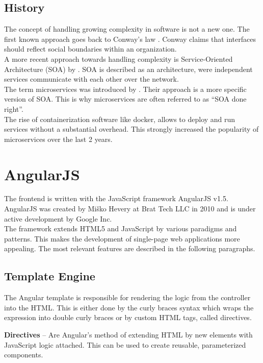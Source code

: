 \subsection{History}
The concept of handling growing complexity in software is not a new one. The first known approach goes back to Conway's law \cite{conway1968committees}. Conway claims that interfaces should reflect social boundaries within an organization.\\
A more recent approach towards handling complexity is Service-Oriented Architecture (SOA) by \cite{as2005service}. SOA is described as an architecture, were independent services communicate with each other over the network.\\
The term microservices was introduced by \cite{martinfowler2014microservices}. Their approach is a more specific version of SOA. This is why microservices are often referred to as \enquote{SOA done right}.\\
The rise of containerization software like docker, allows to deploy and run services without a substantial overhead. This strongly increased the popularity of microservices over the last 2 years.



\section{AngularJS}
\label{sec:angularjs}
The frontend is written with the JavaScript framework AngularJS v1.5. AngularJS was created by Miško Hevery at Brat Tech LLC in 2010 and is under active development by Google Inc. \\
The framework extends HTML5 and JavaScript by various paradigms and patterns. This makes the development of single-page web applications more appealing. The most relevant features are described in the following paragraphs.


\subsection{Template Engine}
The Angular template is responsible for rendering the logic from the controller into the HTML. This is either done by the curly braces syntax which wraps the expression into double curly braces or by custom HTML tags, called directives.\vspace{1ex}

\noindent\textbf{Directives} -- Are Angular's method of extending HTML by new elements with JavaScript logic attached. This can be used to create reusable, parameterized components.

